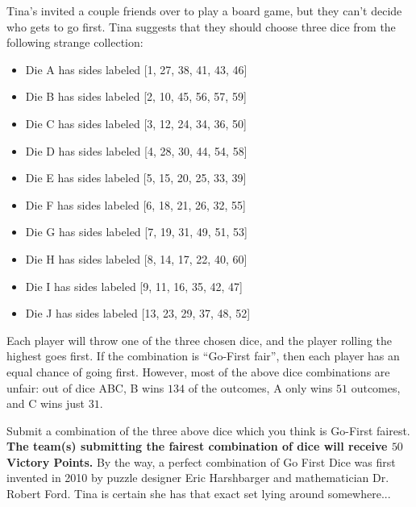 
Tina's invited a couple friends over to play a board game, but they
can't decide who gets to go first. Tina suggests that they should choose
three dice from the following strange collection:

\begin{itemize}
\item Die A has sides labeled [1, 27, 38, 41, 43, 46]
\item Die B has sides labeled [2, 10, 45, 56, 57, 59]
\item Die C has sides labeled [3, 12, 24, 34, 36, 50]
\item Die D has sides labeled [4, 28, 30, 44, 54, 58]
\item Die E has sides labeled [5, 15, 20, 25, 33, 39]
\item Die F has sides labeled [6, 18, 21, 26, 32, 55]
\item Die G has sides labeled [7, 19, 31, 49, 51, 53]
\item Die H has sides labeled [8, 14, 17, 22, 40, 60]
\item Die I has sides labeled [9, 11, 16, 35, 42, 47]
\item Die J has sides labeled [13, 23, 29, 37, 48, 52]
\end{itemize}

Each player will throw one of the three chosen dice, and the player rolling
the highest goes first. If the combination is ``Go-First fair'', then each player has an equal chance of going first. However, most of the
above dice combinations are unfair: out of dice ABC, B wins \(134\) of the
outcomes, A only wins \(51\) outcomes, and C wins just \(31\).

Submit a combination of the three above dice which you think is Go-First fairest.
\textbf{The team(s) submitting the fairest combination of dice
will receive \(50\) Victory Points.} By the way, a perfect combination of
Go First Dice was first
invented in 2010 by puzzle designer Eric Harshbarger and mathematician
Dr. Robert Ford. Tina is certain she has that exact set lying around somewhere...